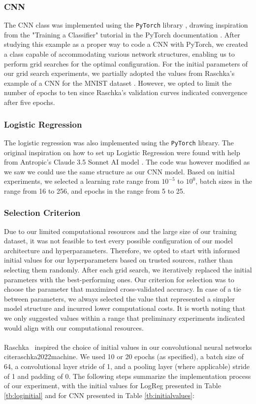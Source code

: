 \subsubsection{CNN}
The CNN class was implemented using the \texttt{PyTorch} library \cite{Paszke2019}, drawing inspiration from the "Training a Classifier" tutorial in the PyTorch documentation \cite{pytorch_cifar10_tutorial}. After studying this example as a proper way to code a CNN with PyTorch, we created a class capable of accommodating various network structures, enabling us to perform grid searches for the optimal configuration. For the initial parameters of our grid search experiments, we partially adopted the values from Raschka's example of a CNN for the MNIST dataset \cite{raschka2022machine}. However, we opted to limit the number of epochs to ten since Raschka's validation curves indicated convergence after five epochs. 

\subsubsection{Logistic Regression}
The logistic regression was also implemented using the \texttt{PyTorch} library. The original inspiration on how to set up Logistic Regression were found with help from Antropic's Claude 3.5 Sonnet AI model \cite{anthropic_claude_3_5_sonnet}. The code was however modified as we saw we could use the same structure as our CNN model. Based on initial experiments, we selected a learning rate range from \( 10^{-5}\) to \( 10^0 \), batch sizes in the range from 16 to 256, and epochs in the range from 5 to 25.

\subsubsection{Selection Criterion}
Due to our limited computational resources and the large size of our training dataset, it was not feasible to test every possible configuration of our model architecture and hyperparameters. Therefore, we opted to start with informed initial values for our hyperparameters based on trusted sources, rather than selecting them randomly. After each grid search, we iteratively replaced the initial parameters with the best-performing ones. Our criterion for selection was to choose the parameter that maximized cross-validated accuracy. In case of a tie between parameters, we always selected the value that represented a simpler model structure and incurred lower computational costs. It is worth noting that we only suggested values within a range that preliminary experiments indicated would align with our computational resources.
\\
\\
Raschka \ inspired the choice of initial values in our convolutional neural networks cite{raschka2022machine}. We used 10 or 20 epochs (as specified), a batch size of 64, a convolutional layer stride of 1, and a pooling layer (where applicable) stride of 1 and padding of 0. The following steps summarize the implementation process of our experiment, with the initial values for LogReg presented in Table \ref{tb:loginitial} and for CNN presented in Table \ref{tb:initialvalues}:

